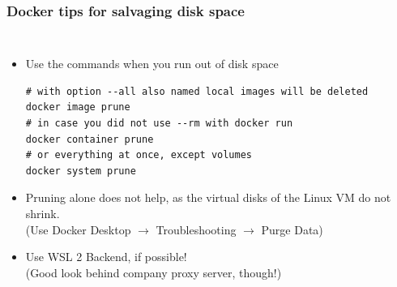 \begin{frame}[fragile]
	\frametitle{Docker tips for salvaging disk space}
	
	\begin{columns}
		\begin{itemize}
			\item Use the  commands when you run out of disk space
			\begin{lstlisting}
# with option --all also named local images will be deleted
docker image prune
# in case you did not use --rm with docker run
docker container prune
# or everything at once, except volumes
docker system prune
			\end{lstlisting}
			\item {} Pruning alone does not help, as the virtual disks of the Linux VM do not shrink.\\
			{\footnotesize (Use Docker Desktop $\rightarrow$ Troubleshooting $\rightarrow$ Purge Data)}
			\item {} Use WSL 2 Backend, if possible!\\
			{\footnotesize (Good look behind company proxy server, though!)}
		\end{itemize}

\end{columns}
\end{frame}
